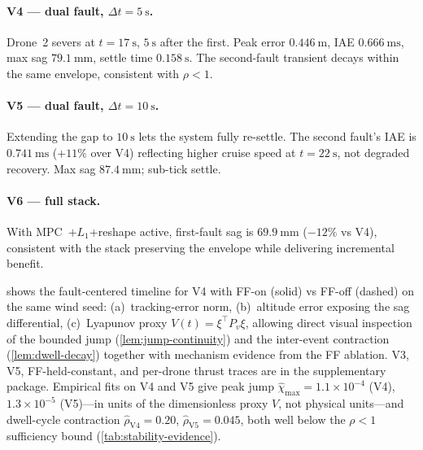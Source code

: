 \paragraph{V4 --- dual fault, $\Delta t = \SI{5}{\second}$.} Drone~2 severs at $t = \SI{17}{\second}$, $\SI{5}{\second}$ after the first. Peak error $\SI{0.446}{\metre}$, IAE $\SI{0.666}{\metre\second}$, max sag $\SI{79.1}{\milli\metre}$, settle time $\SI{0.158}{\second}$. The second-fault transient decays within the same envelope, consistent with $\rho < 1$.

\paragraph{V5 --- dual fault, $\Delta t = \SI{10}{\second}$.} Extending the gap to $\SI{10}{\second}$ lets the system fully re-settle. The second fault's IAE is $\SI{0.741}{\metre\second}$ ($+11\%$ over V4) reflecting higher cruise speed at $t = \SI{22}{\second}$, not degraded recovery. Max sag $\SI{87.4}{\milli\metre}$; sub-tick settle.

\paragraph{V6 --- full stack.} With MPC~$+L_1$+reshape active, first-fault sag is $\SI{69.9}{\milli\metre}$ ($-12\%$ vs V4), consistent with the stack preserving the envelope while delivering incremental benefit.

 shows the fault-centered timeline for V4 with FF-on (solid) vs FF-off (dashed) on the same wind seed: (a)~tracking-error norm, (b)~altitude error exposing the sag differential, (c)~Lyapunov proxy $V(t) = \xi^\top P_v \xi$, allowing direct visual inspection of the bounded jump (\cref{lem:jump-continuity}) and the inter-event contraction (\cref{lem:dwell-decay}) together with mechanism evidence from the FF ablation. V3, V5, FF-held-constant, and per-drone thrust traces are in the supplementary package. Empirical fits on V4 and V5 give peak jump $\hat\chi_{\max} = 1.1\!\times\!10^{-4}$ (V4), $1.3\!\times\!10^{-5}$ (V5)---in units of the dimensionless proxy $V$, not physical units---and dwell-cycle contraction $\hat\rho_{\text{V4}}=0.20$, $\hat\rho_{\text{V5}}=0.045$, both well below the $\rho < 1$ sufficiency bound (\cref{tab:stability-evidence}).

